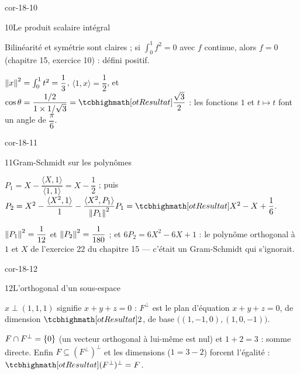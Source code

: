 \begin{blocLivre}{cor-18-10}
\begin{corrige}{10}{Le produit scalaire intégral}
\begin{questions}
  \item Bilinéarité et symétrie sont claires ; si
    $\int_0^1f^{2}=0$ avec $f$ continue, alors $f=0$ (chapitre 15,
    exercice 10) : défini positif.
  \item $\left\lVert x\right\rVert^{2}=\int_0^1t^{2}=\dfrac13$,
    $\langle1,x\rangle=\dfrac12$, et
    $\cos\theta=\dfrac{1/2}{1\times1/\sqrt3}=\res{\dfrac{\sqrt3}{2}}$ :
    les fonctions $1$ et $t\mapsto t$ font un angle de $\dfrac\pi6$.
\end{questions}
\end{corrige}
\end{blocLivre}

\begin{blocLivre}{cor-18-11}
\begin{corrige}{11}{Gram-Schmidt sur les polynômes}
\begin{questions}
  \item $P_1=X-\dfrac{\langle X,1\rangle}{\langle1,1\rangle}
    =X-\dfrac12$ ; puis
    $P_2=X^{2}-\dfrac{\langle X^{2},1\rangle}{1}
    -\dfrac{\langle X^{2},P_1\rangle}{\norme{P_1}^{2}}P_1
    =\res{X^{2}-X+\dfrac16}$.
  \item $\left\lVert P_1\right\rVert^{2}=\dfrac{1}{12}$ et
    $\left\lVert P_2\right\rVert^{2}=\dfrac{1}{180}$ ; et
    $6P_2=6X^{2}-6X+1$ : le polynôme orthogonal à $1$ et $X$ de
    l'exercice 22 du chapitre 15 — c'était un Gram-Schmidt qui
    s'ignorait.
\end{questions}
\end{corrige}
\end{blocLivre}

\begin{blocLivre}{cor-18-12}
\begin{corrige}{12}{L'orthogonal d'un sous-espace}
\begin{questions}
  \item $x\perp(1,1,1)$ signifie $x+y+z=0$ : $F^{\perp}$ est le plan
    d'équation $x+y+z=0$, de dimension $\res{2}$, de base
    $\bigl((1,-1,0),(1,0,-1)\bigr)$.
  \item $F\cap F^{\perp}=\left\{0\right\}$ (un vecteur orthogonal à lui-même est
    nul) et $1+2=3$ : somme directe. Enfin
    $F\subseteq(F^{\perp})^{\perp}$ et les dimensions ($1=3-2$)
    forcent l'égalité : $\res{(F^{\perp})^{\perp}=F}$.
\end{questions}
\end{corrige}
\end{blocLivre}

